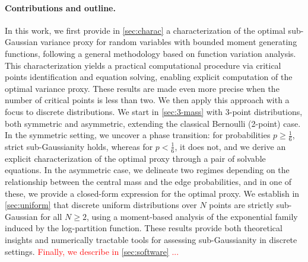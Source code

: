 \documentclass[a4paper, 10pt]{article}
\theoremstyle{definition}
\begin{document}
\paragraph{Contributions and outline.}
In this work, we first provide in \autoref{sec:charac} a characterization of the optimal sub-Gaussian variance proxy for random variables with bounded moment generating functions, following a general methodology based on function variation analysis. This characterization yields a practical computational procedure via critical points identification and equation solving, enabling explicit computation of the optimal variance proxy. These results are made even more precise when the number of critical points is less than two. We then apply this approach with a focus to discrete distributions. We start in \autoref{sec:3-mass} with 3-point distributions, both symmetric and asymmetric, extending the classical Bernoulli (2-point) case. In the symmetric setting, we uncover a phase transition: for probabilities $p \geq \frac{1}{6}$, strict sub-Gaussianity holds, whereas for $p < \frac{1}{6}$, it does not, and we derive an explicit characterization of the optimal proxy through a pair of solvable equations. In the asymmetric case, we delineate two regimes depending on the relationship between the central mass and the edge probabilities, and in one of these, we provide a closed-form expression for the optimal proxy. We establish in \autoref{sec:uniform} that discrete uniform distributions over $N$ points are strictly sub-Gaussian for all $N\geq 2$, using a moment-based analysis of the exponential family induced by the log-partition function. These results provide both theoretical insights and numerically tractable tools for assessing sub-Gaussianity in discrete settings.
\textcolor{red}{Finally, we describe in \autoref{sec:software} ...}
\end{document}
